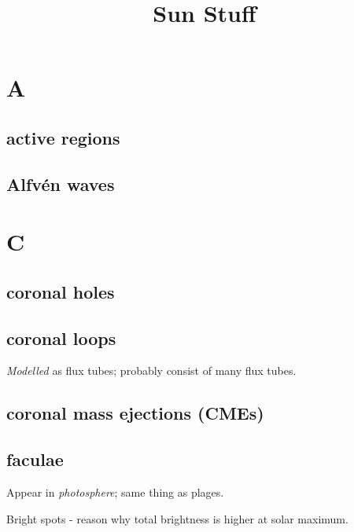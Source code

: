 \documentclass[12pt]{article}
\title{\vspace{-0.5in}Sun Stuff}
\author{}
\date{}
\begin{document}
\maketitle

\vspace{-1in}

\section*{A}

\subsection*{active regions}

\subsection*{Alfv\'en waves}

\section*{C}

\subsection*{coronal holes}

\subsection*{coronal loops}
\begin{itemize*}
    \item \emph{Modelled} as flux tubes; probably consist of
        many flux tubes.
\end{itemize*}

\subsection*{coronal mass ejections (CMEs)}

\subsection*{faculae}
    \begin{itemize*}
        \item Appear in \emph{photosphere}; same thing as plages.
        \item Bright spots - reason why total brightness is higher at
        solar maximum.
    \end{itemize*}
\end{document}
